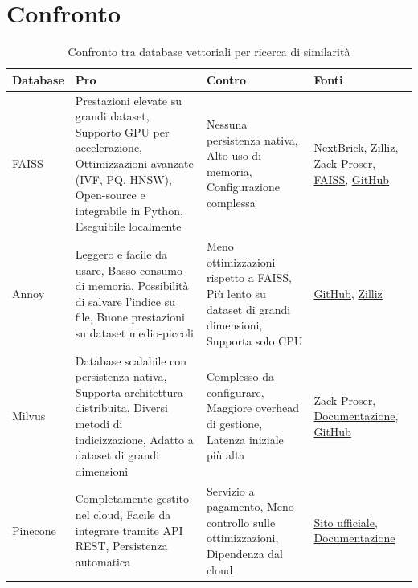 \documentclass{article}
\begin{document}
\section{Confronto}
\begin{table}[H]
    \centering
    \renewcommand{\arraystretch}{1.3}
    \begin{tabular}{|p{2cm}|p{5cm}|p{5cm}|p{2.5cm}|}
        \hline
        \textbf{Database} & \textbf{Pro} & \textbf{Contro} & \textbf{Fonti} \\
        \hline
        FAISS  & Prestazioni elevate su grandi dataset, Supporto GPU per accelerazione, Ottimizzazioni avanzate (IVF, PQ, HNSW), Open-source e integrabile in Python, Eseguibile localmente & Nessuna persistenza nativa, Alto uso di memoria, Configurazione complessa & \href{https://nextbrick.com/exploring-open-source-vector-search-engines-faiss-vs-milvus-vs-pinecone-2/}{NextBrick}, \href{https://zilliz.com/blog/annoy-vs-faiss-choosing-the-right-tool-for-vector-search}{Zilliz}, \href{https://zackproser.com/blog/vector-databases-compared}{Zack Proser}, \href{https://faiss.ai/}{FAISS}, \href{https://github.com/facebookresearch/faiss}{GitHub} \\
        \hline
        Annoy  & Leggero e facile da usare, Basso consumo di memoria, Possibilità di salvare l’indice su file, Buone prestazioni su dataset medio-piccoli & Meno ottimizzazioni rispetto a FAISS, Più lento su dataset di grandi dimensioni, Supporta solo CPU & \href{https://github.com/spotify/annoy}{GitHub}, \href{https://zilliz.com/blog/annoy-vs-faiss-choosing-the-right-tool-for-vector-search}{Zilliz} \\
        \hline
        Milvus & Database scalabile con persistenza nativa, Supporta architettura distribuita, Diversi metodi di indicizzazione, Adatto a dataset di grandi dimensioni & Complesso da configurare, Maggiore overhead di gestione, Latenza iniziale più alta & \href{https://zackproser.com/blog/vector-databases-compared}{Zack Proser}, \href{https://milvus.io/docs/}{Documentazione}, \href{https://github.com/milvus-io/milvus}{GitHub} \\
        \hline
        Pinecone & Completamente gestito nel cloud, Facile da integrare tramite API REST, Persistenza automatica & Servizio a pagamento, Meno controllo sulle ottimizzazioni, Dipendenza dal cloud & \href{https://www.pinecone.io/}{Sito ufficiale}, \href{https://docs.pinecone.io/}{Documentazione} \\
        \hline
    \end{tabular}
    \caption{Confronto tra database vettoriali per ricerca di similarità}
    \label{tab:vector_db_comparison}
\end{table}
\end{document}
